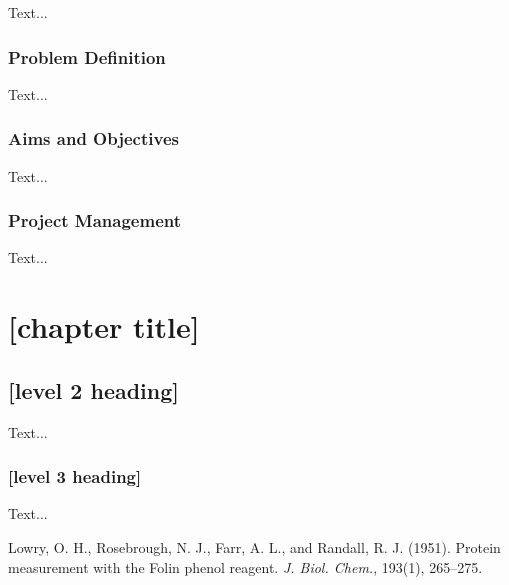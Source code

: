 \documentclass[12pt,a4paper]{report}
\begin{document}
Text...

\subsection{Problem Definition}


Text...

\subsection{Aims and Objectives}


Text...


\subsection{Project Management}


Text...


\chapter{[chapter title]}

\section{[level 2 heading]}

Text...

\subsection{[level 3 heading]}

Text...


\renewcommand{\bibname}{REFERENCES}





\begin{thebibliography}{10}


Lowry, O. H., Rosebrough, N. J., Farr, A. L., and Randall, R. J. (1951). Protein measurement with the Folin phenol reagent. \emph{J. Biol. Chem.}, 193(1), 265--275.

\end{thebibliography}
\end{document}
